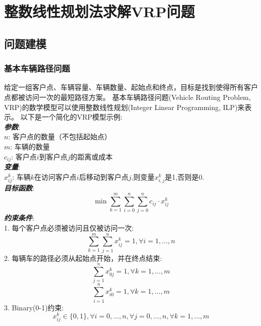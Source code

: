 \section{整数线性规划法求解VRP问题}

\subsection{问题建模}

\subsubsection{基本车辆路径问题}
    给定一组客户点、车辆容量、车辆数量、起始点和终点，目标是找到使得所有客户点都被访问一次的最短路径方案。
    基本车辆路径问题(Vehicle Routing Problem, VRP)的数学模型可以使用整数线性规划(Integer Linear Programming, ILP)来表示。
    以下是一个简化的VRP模型示例:\\
    \textbf{\textit{参数}}:\\
    $n$: 客户点的数量（不包括起始点）\\
    $m$: 车辆的数量\\
    $c_{ij}$: 客户点$i$到客户点$j$的距离或成本\\
    \textbf{\textit{变量}}:\\
    $x_{ij}^{k}$: 车辆$k$在访问客户点$i$后移动到客户点$j$,则变量$x_{i,j}^k$是1,否则是0.\\
    \textbf{\textit{目标函数}}:
    \[\min\sum_{k=1}^{m}\sum_{i=0}^{n}\sum_{j=0}^{n}c_{ij}\cdot x_{ij}^{k}\]
    \textbf{\textit{约束条件}}:\\
    1. 每个客户点必须被访问且仅被访问一次:
    \[\sum_{k=1}^{m}\sum_{j=1}^{n}x_{ij}^{k} = 1, \forall i = 1, \dots, n\]
    2. 每辆车的路径必须从起始点开始，并在终点结束:
    \[\sum_{j = 1}^{n}x_{0j}^{k} = 1, \forall k = 1, \dots, m\]
    \[\sum_{i = 1}^{n}x_{i0}^{k} = 1, \forall k = 1, \dots, m\]
    3. Binary(0-1)约束:
    \[x_{ij}^{k}\in \{0, 1\}, \forall i = 0, \dots, n, \forall j = 0, \dots, n, \forall k = 1, \dots, m\]
